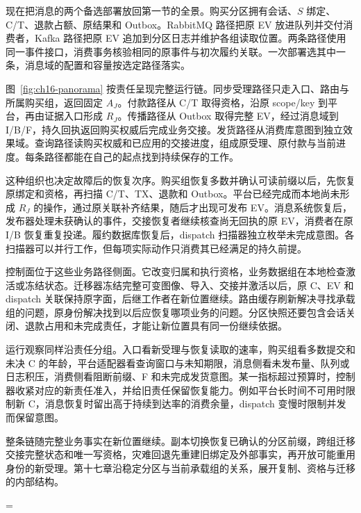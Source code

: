 现在把消息的两个备选部署放回第一节的全景。购买分区拥有会话、$S$ 绑定、C/T、退款占额、原结果和 Outbox。RabbitMQ 路径把原 EV 放进队列并交付消费者，Kafka 路径把原 EV 追加到分区日志并维护各组读取位置。两条路径使用同一事件接口，消费事务核验相同的原事件与初次履约关联。一次部署选其中一条，消息域的配置和容量按选定路径落实。

图~\ref{fig:ch16-panorama} 按责任呈现完整运行链。同步受理路径只走入口、路由与所属购买组，返回固定 $A_J$。付款路径从 C/T 取得资格，沿原 scope/key 到平台，再由证据入口形成 $R_J$。传播路径从 Outbox 取得完整 EV，经过消息域到 I/B/F，持久回执返回购买权威后完成业务交接。发货路径从消费库意图到独立效果域。查询路径读购买权威和已应用的交接进度，组成原受理、原付款与当前进度。每条路径都能在自己的起点找到持续保存的工作。

\begingroup
\renewcommand{\CSixteenFigureWidth}{.90\linewidth}
\endgroup

这种组织也决定故障后的恢复次序。购买组恢复多数并确认可读前缀以后，先恢复原绑定和资格，再扫描 C/T、TX、退款和 Outbox。平台已经完成而本地尚未形成 $R_J$ 的操作，通过原关联补齐结果，随后才出现可发布 EV。消息系统恢复后，发布器处理未获确认的事件，交接恢复者继续核查尚无回执的原 EV，消费者在原 I/B 恢复重复投递。履约数据库恢复后，dispatch 扫描器独立枚举未完成意图。各扫描器可以并行工作，但每项实际动作只消费其已经满足的持久前提。

控制面位于这些业务路径侧面。它改变归属和执行资格，业务数据组在本地检查激活或冻结状态。迁移器冻结完整可变图像、导入、交接并激活以后，原 C、EV 和 dispatch 关联保持原字面，后继工作者在新位置继续。路由缓存刷新解决寻找承载组的问题，原身份解决找到以后应恢复哪项业务的问题。分区快照还要包含会话关闭、退款占用和未完成责任，才能让新位置具有同一份继续依据。

运行观察同样沿责任分组。入口看新受理与恢复读取的速率，购买组看多数提交和未决 C 的年龄，平台适配器看查询窗口与未知期限，消息侧看未发布量、队列或日志积压，消费侧看阻断前缀、F 和未完成发货意图。某一指标超过预算时，控制器收紧对应的新责任准入，并给旧责任保留恢复能力。例如平台长时间不可用时限制新 C，消息恢复时留出高于持续到达率的消费余量，dispatch 变慢时限制并发而保留意图。

整条链随完整业务事实在新位置继续。副本切换恢复已确认的分区前缀，跨组迁移交接完整状态和唯一写资格，灾难回退先重建旧绑定及外部事实，再开放可能重用身份的新受理。第十七章沿稳定分区与当前承载组的关系，展开复制、资格与迁移的内部结构。

\par
\let\code\BeforeSixteenCode
\setlength{\emergencystretch}{\BeforeSixteenEmergency}
\tolerance=\BeforeSixteenTolerance\relax
